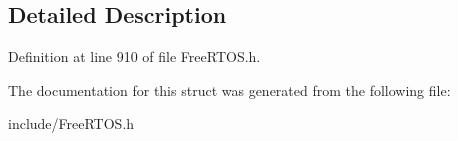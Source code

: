 \subsection{Detailed Description}


Definition at line 910 of file Free\+R\+T\+O\+S.\+h.



The documentation for this struct was generated from the following file\+:\begin{DoxyCompactItemize}
\item 
include/Free\+R\+T\+O\+S.\+h\end{DoxyCompactItemize}
